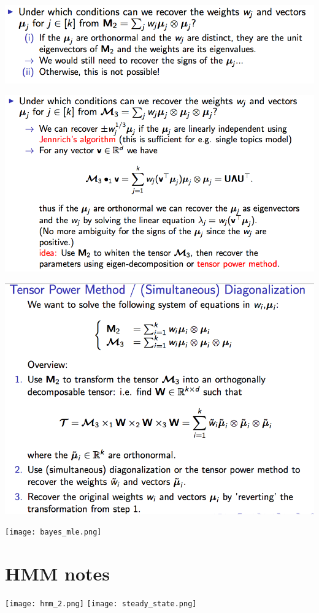 \includegraphics[width=\linewidth]{tensor_decomp.png}

\includegraphics[width=\linewidth]{tensor_decomp_2.png}

\includegraphics[width=\linewidth]{tensor_decomp_3.png}

\texttt{[image: bayes\_mle.png]}


\section{HMM notes}
\texttt{[image: hmm\_2.png]}
\texttt{[image: steady\_state.png]}

